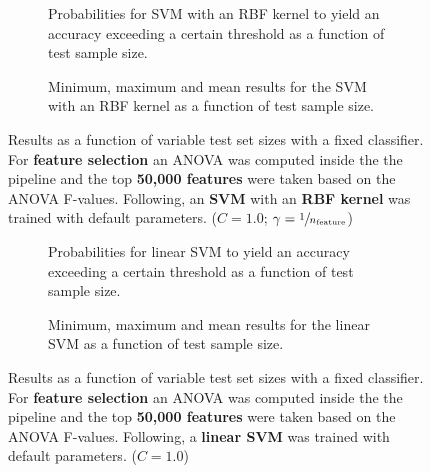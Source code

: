 \begin{figure}
    \captionsetup[subfigure]{justification=justified,singlelinecheck=false}
    \begin{subfigure}[t]{0.61\textwidth}
        
        \caption{Probabilities for SVM with an RBF kernel to yield an accuracy exceeding a certain threshold as a function of test sample size.}
    \end{subfigure}
    \hspace{3.0mm}
    \begin{subfigure}[t]{0.34\textwidth}
        
        \caption{Minimum, maximum and mean results for the SVM with an RBF kernel as a function of test sample size.}
    \end{subfigure}
    \caption[Effects of varying test sample size. SVM (kernel = RBF); Preprocessing: ANOVA feature selection ($k_\text{best} = \num{50000}$)]{Results as a function of variable test set sizes with a fixed classifier. For \textbf{feature selection} an ANOVA was computed inside the the pipeline and the top \textbf{50,000 features} were taken based on the ANOVA F-values. Following, an \textbf{{SVM}} with an \textbf{{RBF kernel}} was trained with default parameters. ($C=\num{1.0}$; $\gamma=\sfrac{1}{n_\text{feature}}$)}
    \label{fig:no_PCA_50000_best_selected_SVC}
\end{figure}

\begin{figure}
    \captionsetup[subfigure]{justification=justified,singlelinecheck=false}
    \begin{subfigure}[t]{0.61\textwidth}
        
        \caption{Probabilities for linear SVM to yield an accuracy exceeding a certain threshold as a function of test sample size.}
    \end{subfigure}
    \hspace{3.0mm}
    \begin{subfigure}[t]{0.34\textwidth}
        
        \caption{Minimum, maximum and mean results for the linear SVM as a function of test sample size.}
    \end{subfigure}
    \caption[Effects of varying test sample size. Linear SVM; Preprocessing: ANOVA feature selection ($k_\text{best} = \num{50000}$)]{Results as a function of variable test set sizes with a fixed classifier. For \textbf{feature selection} an ANOVA was computed inside the the pipeline and the top \textbf{50,000 features} were taken based on the ANOVA F-values. Following, a \textbf{{linear SVM}} was trained with default parameters. ($C=\num{1.0}$)}
    \label{fig:no_PCA_50000_best_selected_LinearSVC}
\end{figure}

